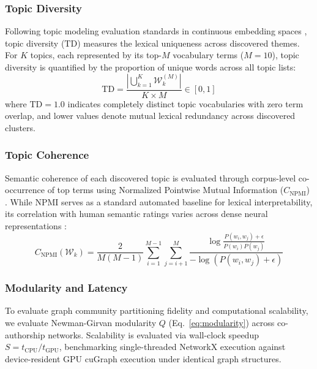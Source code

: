 \documentclass[preprint,12pt]{elsarticle}
\begin{document}
\subsubsection{Topic Diversity}
Following topic modeling evaluation standards in continuous embedding spaces \cite{dieng2020topic}, topic diversity ($\text{TD}$) measures the lexical uniqueness across discovered themes. For $K$ topics, each represented by its top-$M$ vocabulary terms ($M=10$), topic diversity is quantified by the proportion of unique words across all topic lists:
\begin{equation}
\text{TD} = \frac{|\bigcup_{k=1}^K \mathcal{W}_k^{(M)}|}{K \times M} \in [0, 1]
\end{equation}
where $\text{TD} = 1.0$ indicates completely distinct topic vocabularies with zero term overlap, and lower values denote mutual lexical redundancy across discovered clusters.

\subsubsection{Topic Coherence}
Semantic coherence of each discovered topic is evaluated through corpus-level co-occurrence of top terms using Normalized Pointwise Mutual Information ($C_{\text{NPMI}}$) \cite{bouma2009normalized, roder2015exploring}. While NPMI serves as a standard automated baseline for lexical interpretability, its correlation with human semantic ratings varies across dense neural representations \cite{hoyle2021automated}:
\begin{equation}
\label{eq:npmi}
C_{\text{NPMI}}(\mathcal{W}_k) = \frac{2}{M(M-1)} \sum_{i=1}^{M-1} \sum_{j=i+1}^M \frac{\log \frac{P(w_i, w_j) + \epsilon}{P(w_i)P(w_j)}}{-\log(P(w_i, w_j) + \epsilon)}
\end{equation}

\subsubsection{Modularity and Latency}
To evaluate graph community partitioning fidelity and computational scalability, we evaluate Newman-Girvan modularity $Q$ (Eq.~\ref{eq:modularity}) \cite{blondel2008fast, traag2019louvain} across co-authorship networks. Scalability is evaluated via wall-clock speedup $S = t_{\text{CPU}} / t_{\text{GPU}}$, benchmarking single-threaded NetworkX execution against device-resident GPU cuGraph execution under identical graph structures.
\end{document}
